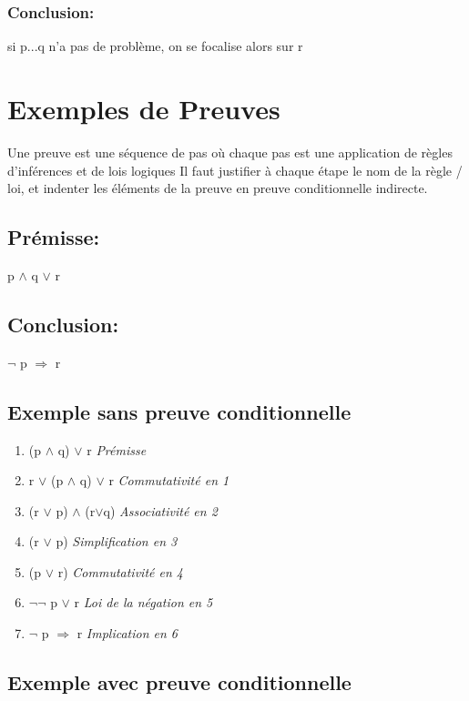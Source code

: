\subsubsection{Conclusion:}

si p...q n'a pas de problème, on se focalise alors sur r
 

\section{Exemples de Preuves}

Une preuve est une séquence de pas où chaque pas est une application de règles d'inférences et de lois logiques
Il faut justifier à chaque étape le nom de la règle / loi, et indenter les éléments de la preuve en preuve conditionnelle indirecte.

\subsection{Prémisse:} 

p $\land$ q $\lor$ r

\subsection{Conclusion:}

$\lnot$ p $\Rightarrow$ r

\subsection{Exemple sans preuve conditionnelle}

\begin{enumerate}
\item   (p $\land$ q) $\lor$ r  \it{Prémisse}
\item   r $\lor$ (p $\land$ q)  $\lor$ r \it{Commutativité en 1}
\item   (r $\lor$ p) $\land$ (r$\lor$q) \it{Associativité en 2}
\item   (r $\lor$ p) \it{Simplification en 3}
\item   (p $\lor$ r) \it{Commutativité en 4}
\item   $\lnot$$\lnot$ p $\lor$ r \it{Loi de la négation en 5}
\item   $\lnot$ p $\Rightarrow$ r \it{Implication en 6}
\end{enumerate}

\subsection{Exemple avec preuve conditionnelle}

